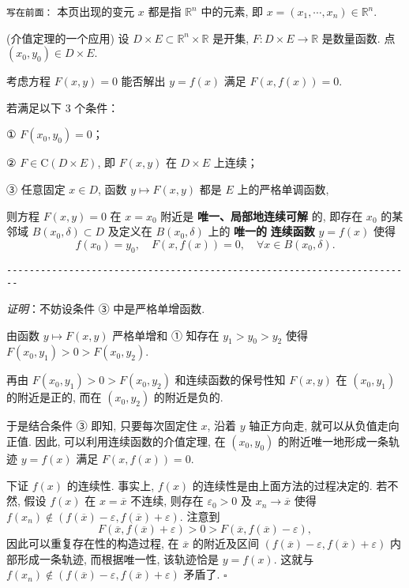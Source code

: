 
\verb|写在前面：|
本页出现的变元 $x$ 都是指 $\mathbb{R}^n$ 中的元素, 即 $x=(x_1,\cdots,x_n)\in\mathbb{R}^n.$


\begin{theorem}{(介值定理的一个应用)}
设 $D\times E\subset\mathbb{R}^{n}\times\mathbb{R}$ 是开集,
$F:D\times E\rightarrow\mathbb{R}$ 是数量函数. 点 $(x_{0},y_{0})\in D\times E.$ 

考虑方程 $F(x,y)=0$ 能否解出 $y=f(x)$ 满足 $F(x,f(x))=0.$ 

若满足以下 3 个条件：

① $F(x_{0},y_{0})=0$；

② $F\in\mathrm{C}(D\times E)$, 即 $F(x,y)$ 在 $D\times E$ 上连续；

③ 任意固定 $x\in D$, 函数 $y\mapsto F(x,y)$ 都是 $E$ 上的严格单调函数, 

则方程 $F(x,y)=0$ 在 $x=x_{0}$ 附近是\textbf{ 唯一、局部地连续可解} 的, 即存在 $x_{0}$
的某邻域 $B(x_{0},\delta)\subset D$ 及定义在 $B(x_{0},\delta)$ 上的 \textbf{唯一的}\textbf{
连续函数} $y=f(x)$ 使得
\[
f(x_{0})=y_{0},\quad F(x,f(x))=0,\quad\forall x\in B(x_{0},\delta).
\]

\verb|------------------------------------------------------------------------|

\textsl{证明}：不妨设条件 ③ 中是严格单增函数. 

由函数 $y\mapsto F(x,y)$ 严格单增和 ① 知存在 $y_{1}>y_{0}>y_{2}$ 使得 $F(x_{0},y_{1})>0>F(x_{0},y_{2})$. 

再由 $F(x_{0},y_{1})>0>F(x_{0},y_{2})$ 和连续函数的保号性知 $F(x,y)$ 在 $(x_{0},y_{1})$
的附近是正的, 而在 $(x_{0},y_{2})$ 的附近是负的. 

于是结合条件 ③ 即知, 只要每次固定住 $x$, 沿着 $y$ 轴正方向走, 就可以从负值走向正值. 因此, 可以利用连续函数的介值定理,
在 $(x_{0},y_{0})$ 的附近唯一地形成一条轨迹 $y=f(x)$ 满足 $F(x,f(x))=0$. 

下证 $f(x)$ 的连续性. 事实上, $f(x)$ 的连续性是由上面方法的过程决定的. 若不然, 假设 $f(x)$ 在
$x=\overline{x}$ 不连续, 则存在 $\varepsilon_{0}>0$ 及 $x_{n}\rightarrow\overline{x}$
使得 $f(x_{n})\notin(f(\overline{x})-\varepsilon,f(\overline{x})+\varepsilon)$.
注意到
\[
F(\overline{x},f(\overline{x})+\varepsilon)>0>F(\overline{x},f(\overline{x})-\varepsilon),
\]
因此可以重复存在性的构造过程, 在 \textbf{$\overline{x}$ }的附近及区间 $(f(\overline{x})-\varepsilon,f(\overline{x})+\varepsilon)$
内部形成一条轨迹, 而根据唯一性, 该轨迹恰是 $y=f(x)$. 这就与 $f(x_{n})\notin(f(\overline{x})-\varepsilon,f(\overline{x})+\varepsilon)$
矛盾了. $\square$ 
\end{theorem}
\[
\]

